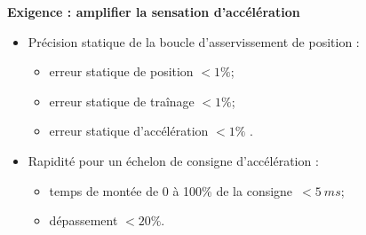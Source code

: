 \begin{multicols}{2}
\textbf{Exigence : amplifier la sensation d'accélération}
\begin{itemize}
\item  Précision statique de la boucle d'asservissement de position :
\begin{itemize}
\item erreur statique de position $<1\%$;
\item erreur statique de traînage $<1\%$; 
\item erreur statique d'accélération $<1\%$ .
\end{itemize}
\item Rapidité pour un échelon de consigne d'accélération :
\begin{itemize}
\item temps de montée de 0 à 100\% de la consigne~$<\SI{5}{ms}$;
\item dépassement $<20\%$.
\end{itemize}
\end{itemize}
\fi

%    


\end{multicols}

